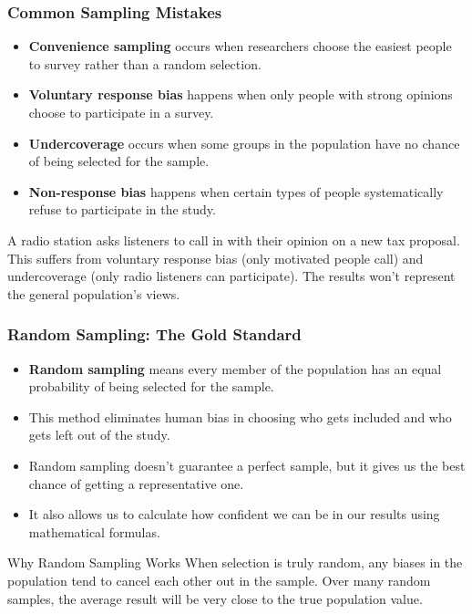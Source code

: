 \documentclass{beamer}
\begin{document}
	\begin{frame}
		\frametitle{Common Sampling Mistakes}
		
		\begin{itemize}
			\item \textbf{Convenience sampling} occurs when researchers choose the easiest people to survey rather than a random selection.
			\item \textbf{Voluntary response bias} happens when only people with strong opinions choose to participate in a survey.
			\item \textbf{Undercoverage} occurs when some groups in the population have no chance of being selected for the sample.
			\item \textbf{Non-response bias} happens when certain types of people systematically refuse to participate in the study.
		\end{itemize}
		
		\begin{example}
			A radio station asks listeners to call in with their opinion on a new tax proposal. This suffers from voluntary response bias (only motivated people call) and undercoverage (only radio listeners can participate). The results won't represent the general population's views.
		\end{example}
		
	\end{frame}
	
	\begin{frame}
		\frametitle{Random Sampling: The Gold Standard}
		
		\begin{itemize}
			\item \textbf{Random sampling} means every member of the population has an equal probability of being selected for the sample.
			\item This method eliminates human bias in choosing who gets included and who gets left out of the study.
			\item Random sampling doesn't guarantee a perfect sample, but it gives us the best chance of getting a representative one.
			\item It also allows us to calculate how confident we can be in our results using mathematical formulas.
		\end{itemize}
		
		\begin{block}{Why Random Sampling Works}
			When selection is truly random, any biases in the population tend to cancel each other out in the sample. Over many random samples, the average result will be very close to the true population value.
		\end{block}
		
	\end{frame}
	
\end{document}
